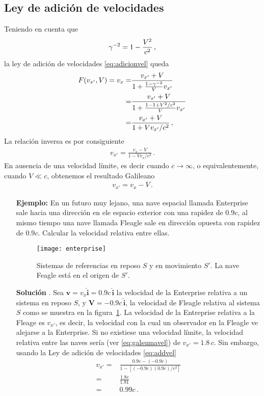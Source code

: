 \subsection{Ley de adición de velocidades}
\begin{frame}
Teniendo en cuenta que
\begin{align*}
  \gamma^{-2}=1-\frac{V^2}{c^2}\,,
\end{align*}
la ley de adición de velocidades \eqref{eq:adicionvel} queda
\begin{align*}
  F(v_{x'},V)=v_{x}=&\frac{v_{x'}+V}{1+\frac{1-\gamma^{-2}}{V}v_{x'}}\nonumber\\
  =&\frac{v_{x'}+V}{1+\frac{1-1+V^2/c^2}{V}v_{x'}}\nonumber\\
  =&\frac{v_{x'}+V}{1+{Vv_{x'}}/{c^2}}\,,
\end{align*}
La relación inversa es por consiguiente
\begin{align}
  \label{eq:addvel}
v_{x'}=\frac{v_x-V}{1-V v_x/c^2}\,.
\end{align}
En ausencia de una velocidad límite, es decir cuando $c\to \infty$, o equivalentemente, cuando $V\ll c$, obtenemos el resultado Galileano
\begin{align}
  \label{eq:galsumavel}
  v_{x'}=v_x-V\,.
\end{align}


\begin{itemize}
\item[\textbf{Ejemplo:}] En un futuro muy lejano, una nave espacial llamada Enterprise sale hacia una dirección en ele espacio exterior con una rapidez de $0.9c$, al mismo tiempo una nave llamada Fleagle sale en dirección opuesta con rapidez de $0.9c$. Calcular la velocidad relativa entre ellas.
  \begin{figure}
    \centering
    \texttt{[image: enterprise]}
    \caption{Sistemas de referencias en reposo $S$ y en movimiento $S'$. La nave Feagle está en el origen de $S'$.}
    \label{fig:enterprise}    
  \end{figure}
\item[\textbf{Solución}].  Sea $\mathbf{v}=v_x\hat{\mathbf{i}}=0.9c\,\hat{\mathbf{i}}$ la velocidad de la Enterprise relativa a un sistema en reposo $S$, y $\mathbf{V}=-0.9c\,\hat{\mathbf{i}}$, la velocidad de Fleagle relativa al sistema $S$ como se muestra en la figura~\ref{fig:enterprise}. La velocidad de la Entreprise relativa a la Fleage es $v_{x'}$, es decir, la velocidad con la cual un observador en la Fleagle ve alejarse a la Enterprise. Si no existiese una velocidad límite, la velocidad relativa entre las naves sería (ver \eqref{eq:galsumavel}) de $v_{x'}=1.8\,c$. Sin embargo, usando la Ley de adición de velocidades \eqref{eq:addvel}
  \begin{align*}
    v_{x'}=&\frac{0.9c-(-0.9c)}{1-[(-0.9c)(0.9c)/c^2]}\nonumber\\
    =&\frac{1.8c}{1.81}\nonumber\\
    =&0.99c\,.
  \end{align*}


\end{itemize}
\end{frame}
